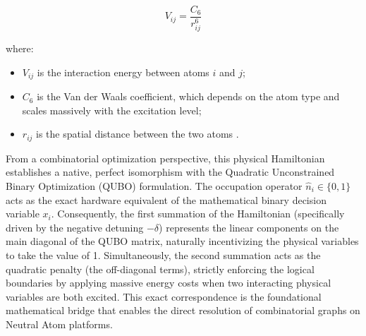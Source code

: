 \begin{equation}
V_{ij} = \frac{C_6}{r_{ij}^6}
\end{equation}

where:
\begin{itemize}
    \item $V_{ij}$ is the interaction energy between atoms $i$ and $j$;
    \item $C_6$ is the Van der Waals coefficient, which depends on the atom type and scales massively with the excitation level;
    \item $r_{ij}$ is the spatial distance between the two atoms \cite{Henriet2020quantumcomputing}.
\end{itemize}

From a combinatorial optimization perspective, this physical Hamiltonian establishes a native, perfect isomorphism with the Quadratic Unconstrained Binary Optimization (QUBO) formulation. The occupation operator $\hat{n}_i \in \{0, 1\}$ acts as the exact hardware equivalent of the mathematical binary decision variable $x_i$. Consequently, the first summation of the Hamiltonian (specifically driven by the negative detuning $-\delta$) represents the linear components on the main diagonal of the QUBO matrix, naturally incentivizing the physical variables to take the value of 1. Simultaneously, the second summation acts as the quadratic penalty (the off-diagonal terms), strictly enforcing the logical boundaries by applying massive energy costs when two interacting physical variables are both excited. This exact correspondence is the foundational mathematical bridge that enables the direct resolution of combinatorial graphs on Neutral Atom platforms.